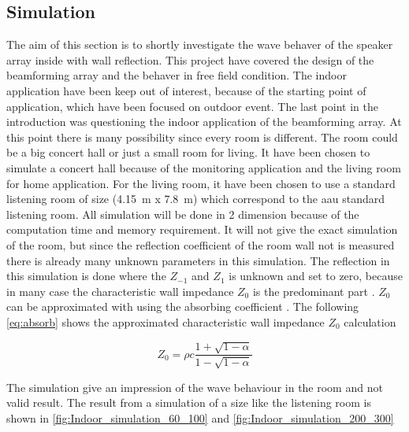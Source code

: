 \subsection{Simulation}\label{sec:dis:simulation}
The aim of this section is to shortly investigate the wave behaver of the speaker array inside with wall reflection. This project have covered the design of the beamforming array and the behaver in free field condition. The indoor application have been keep out of interest, because of the starting point of application, which have been focused on outdoor event. The last point in the introduction was questioning the indoor application of the beamforming array. At this point there is many possibility since every room is different. The room could be a big concert hall or just a small room for living. It have been chosen to simulate a concert hall because of the monitoring application and the living room for home application. For the living room, it have been chosen to use a standard listening room of size (\SI{4.15}{\meter} x \SI{7.8}{\meter}) which correspond to the \gls{aau} standard listening room. All simulation will be done in 2 dimension because of the computation time and memory requirement. It will not give the exact simulation of the room, but since the reflection coefficient of the room wall not is measured there is already many unknown parameters in this simulation. The reflection in this simulation is done where the $Z_{-1}$ and $Z_{1}$ is unknown and set to zero, because in many case the characteristic wall impedance $Z_0$ is the predominant part \citep{fdtd_imp}. $Z_0$ can be approximated with using the absorbing coefficient \citep{fdtd_imp}. The following \autoref{eq:absorb} shows the approximated characteristic wall impedance $Z_0$ calculation

\begin{equation}\label{eq:absorb}
Z_0 = \rho c \frac{1+\sqrt{1-\alpha}}{1-\sqrt{1-\alpha}}
\end{equation}

        \startexplain
    \stopexplain
    
 The simulation give an impression of the wave behaviour in the room and not valid result. The result from a simulation of a size like the listening room is shown in \autoref{fig:Indoor_simulation_60_100} and \autoref{fig:Indoor_simulation_200_300}



